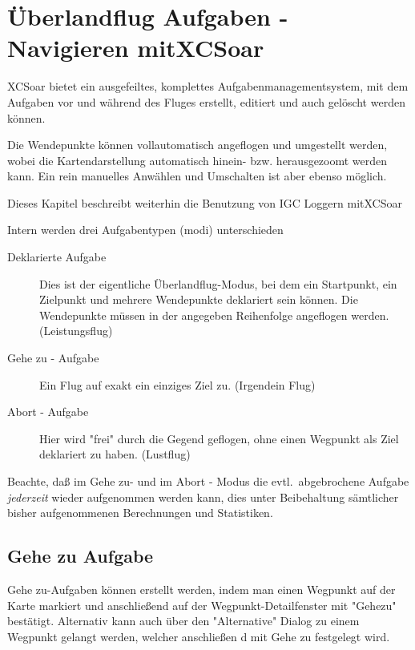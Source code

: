 \setcounter{chapter}{4}
\chapter{Überlandflug Aufgaben - Navigieren mit\textsf{XCSoar}}\label{cha:tasks}

\textsf{XCSoar} bietet ein ausgefeiltes, komplettes Aufgabenmanagementsystem, mit dem Aufgaben vor und während des Fluges erstellt, editiert und auch gelöscht werden können.

Die Wendepunkte können vollautomatisch angeflogen und umgestellt werden, wobei die Kartendarstellung automatisch hinein- bzw. herausgezoomt werden kann. Ein rein manuelles  Anwählen und Umschalten ist aber ebenso möglich.

Dieses Kapitel beschreibt weiterhin die Benutzung von \textsf{IGC} Loggern mit\textsf{XCSoar}

Intern werden drei Aufgabentypen (modi)  unterschieden
\begin{description}
\item[Deklarierte Aufgabe] Dies ist der eigentliche Überlandflug-Modus, bei dem ein Startpunkt, ein
    Zielpunkt und mehrere Wendepunkte deklariert sein können. Die Wendepunkte müssen in der
    angegeben Reihenfolge angeflogen werden. (Leistungsflug)
\item[Gehe zu - Aufgabe] Ein Flug auf exakt ein einziges Ziel zu. (Irgendein Flug)
\item[Abort - Aufgabe] Hier wird "frei" durch die Gegend geflogen, ohne einen Wegpunkt als  Ziel
    deklariert zu haben. (Lustflug)
\end{description}

 Beachte, daß im Gehe zu- und im Abort - Modus  die  evtl.\ abgebrochene Aufgabe \textsl{jederzeit} wieder \tip aufgenommen werden kann, dies unter Beibehaltung sämtlicher bisher aufgenommenen Berechnungen und Statistiken.

\section{Gehe zu Aufgabe}

Gehe zu-Aufgaben können erstellt werden, indem man einen Wegpunkt auf der Karte markiert und anschließend auf der Wegpunkt-Detailfenster mit "Gehezu" bestätigt.  Alternativ kann auch über den "Alternative" Dialog zu einem Wegpunkt gelangt werden, welcher anschließen d mit Gehe zu festgelegt wird.

